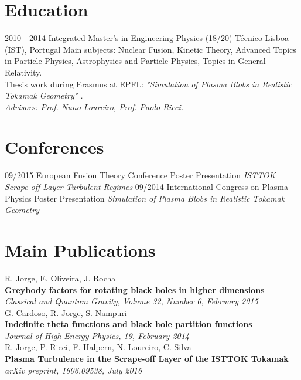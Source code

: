 \documentclass[]{friggeri-cv}
\begin{document}
\section{Education}
\begin{entrylist}
  \entry
    {2010 - 2014}
    {Integrated Master's in Engineering Physics (18/20)}
    {Técnico Lisboa (IST), Portugal}
    {Main subjects: Nuclear Fusion, Kinetic Theory, Advanced Topics in Particle Physics, Astrophysics and Particle Physics, Topics in General Relativity.\\
    Thesis work during Erasmus at EPFL: \emph{"Simulation of Plasma Blobs in Realistic Tokamak Geometry"      .}\\
    \emph{Advisors: Prof. Nuno Loureiro, Prof. Paolo Ricci.}\\}
\end{entrylist}

\section{Conferences}
\begin{entrylist}
  \entry
    {09/2015}
    {European Fusion Theory Conference}
    {Poster Presentation}
    {\emph{ISTTOK Scrape-off Layer Turbulent Regimes}}
  \entry
    {09/2014}
    {International Congress on Plasma Physics}
    {Poster Presentation}
    {\emph{Simulation of Plasma Blobs in Realistic Tokamak Geometry}}
\end{entrylist}


\section{Main Publications}
R. Jorge, E. Oliveira, J. Rocha\\
\textbf{Greybody factors for rotating black holes in higher dimensions}\\
\emph{Classical and Quantum Gravity, Volume 32, Number 6, February 2015}
\\
G. Cardoso, R. Jorge, S. Nampuri\\
\textbf{Indefinite theta functions and black hole partition functions}\\
\emph{Journal of High Energy Physics, 19, February 2014}
\\
R. Jorge, P. Ricci, F. Halpern, N. Loureiro, C. Silva\\
\textbf{Plasma Turbulence in the Scrape-off Layer of the ISTTOK Tokamak}\\
\emph{arXiv preprint, 1606.09538, July 2016}
\end{document}
